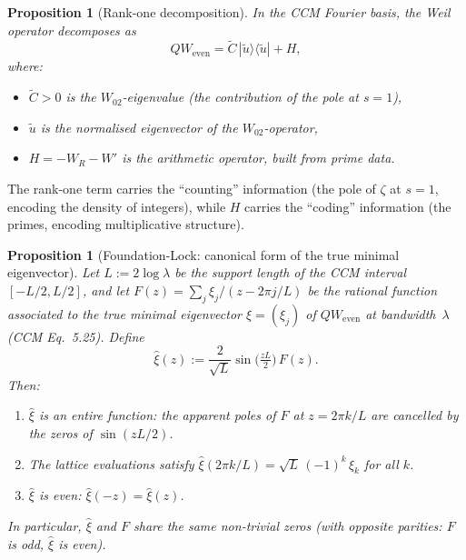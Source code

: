 \documentclass[12pt,a4paper]{article}
\newtheorem{proposition}[theorem]{Proposition}
\theoremstyle{definition}
\theoremstyle{remark}
\newcommand{\utilde}{\tilde{u}}
\newcommand{\Ctilde}{\tilde{C}}
\begin{document}
\begin{proposition}[Rank-one decomposition]
\label{prop:rank1}
In the CCM Fourier basis, the Weil operator decomposes as
\begin{equation}
\label{eq:rank1}
QW_{\mathrm{even}} = \Ctilde \, |\utilde\rangle\langle\utilde| + H,
\end{equation}
where:
\begin{itemize}
\item $\Ctilde > 0$ is the $W_{02}$-eigenvalue (the contribution of
  the pole at $s = 1$),
\item $\utilde$ is the normalised eigenvector of the $W_{02}$-operator,
\item $H = -W_R - W'$ is the arithmetic operator, built from prime data.
\end{itemize}
\end{proposition}

The rank-one term carries the ``counting'' information (the pole of
$\zeta$ at $s = 1$, encoding the density of integers), while $H$ carries
the ``coding'' information (the primes, encoding multiplicative structure).

\begin{proposition}[Foundation-Lock: canonical form of the true minimal eigenvector]
\label{prop:foundation-lock}
Let $L := 2\log\lambda$ be the support length of the CCM interval
$[-L/2, L/2]$, and let $F(z) = \sum_{j} \xi_j / (z - 2\pi j / L)$ be the
rational function associated to the true minimal eigenvector $\xi = (\xi_j)$
of $QW_{\mathrm{even}}$ at bandwidth~$\lambda$ (CCM Eq.~5.25).  Define
\begin{equation}
\label{eq:xihat-def}
  \hat{\xi}(z) := \frac{2}{\sqrt{L}} \sin\!\bigl(\tfrac{zL}{2}\bigr)\, F(z).
\end{equation}
Then:
\begin{enumerate}[label=(\alph*)]
  \item $\hat{\xi}$ is an \emph{entire} function: the apparent poles of $F$ at
    $z = 2\pi k/L$ are cancelled by the zeros of $\sin(zL/2)$.
  \item The lattice evaluations satisfy
    $\hat{\xi}(2\pi k/L) = \sqrt{L}\,(-1)^k\,\xi_k$ for all $k$.
  \item $\hat{\xi}$ is even: $\hat{\xi}(-z) = \hat{\xi}(z)$.
\end{enumerate}
In particular, $\hat{\xi}$ and $F$ share the same non-trivial zeros
(with opposite parities: $F$ is odd, $\hat{\xi}$ is even).
\end{proposition}
\end{document}
